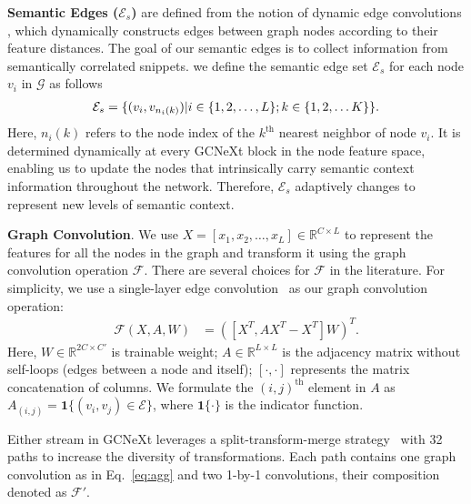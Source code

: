 \documentclass[10pt,twocolumn,letterpaper]{article}
\newcommand{\F}{\mathcal{F}}
\newcommand{\E}{\mathcal{E}}
\begin{document}
\noindent \textbf{Semantic Edges ($\mathcal{E}_s$)} are defined from the notion of dynamic edge convolutions \cite{wang2018dynamic}, which dynamically constructs edges between graph nodes according to their feature distances. The goal of our semantic edges is
to collect information from semantically correlated snippets. 
we define the semantic edge set $\mathcal{E}_s$ for each node $v_{i}$ in  $\mathcal{G}$ as follows
\begin{align} \mathcal{E}_s=\{(v_i,v_{n_i(k)})|i\in\{1,2,\dots,L\}; k\in\{1,2,\dots K\}\} \notag.
\end{align}
Here, ${n_i(k)}$ refers to the node index of the $k^{\textrm{th}}$ nearest neighbor of node $v_i$. It is determined dynamically at every GCNeXt block in the node feature space, enabling us to update the nodes
that intrinsically carry semantic context information throughout the network. Therefore, $\E_s$ adaptively changes to represent new levels of semantic context. 








\noindent \textbf{Graph Convolution}. We use 
$X=[x_1,x_2,\dots,x_L]\in \mathbb{R}^{C \times L}$ to represent the features for all the nodes in the graph and transform it using the graph convolution operation $\F$. There are several choices for $\F$ in the literature. For simplicity,
we use a single-layer edge convolution~\cite{wang2018dynamic} as our graph convolution operation: 
\begin{align} \label{eq:agg}
   \F(X,A,W)&=([X^T,AX^T-X^T] W)^T .
\end{align}
Here, $W\in \mathbb{R}^{2 C \times C'}$ is trainable weight;
$A\in \mathbb{R}^{L \times L}$ is the adjacency matrix without self-loops (\ie edges between a node and itself); $[\cdot,\cdot]$ represents the matrix concatenation of columns.
We formulate the $(i,j)^\textrm{th}$ element in $A$ as $A_{(i,j)} = {\mathbf{1}}\{(v_i,v_j)\in \E\}$, 
where $\mathbf{1}\{\cdot\}$ is the indicator function.








Either stream in GCNeXt leverages a split-transform-merge strategy~\cite{xie2017aggregated} with 32 paths to increase the diversity of transformations. Each path contains one graph convolution as in Eq.~\ref{eq:agg}  and two 1-by-1 convolutions, their composition denoted as $\F'$.
\end{document}
